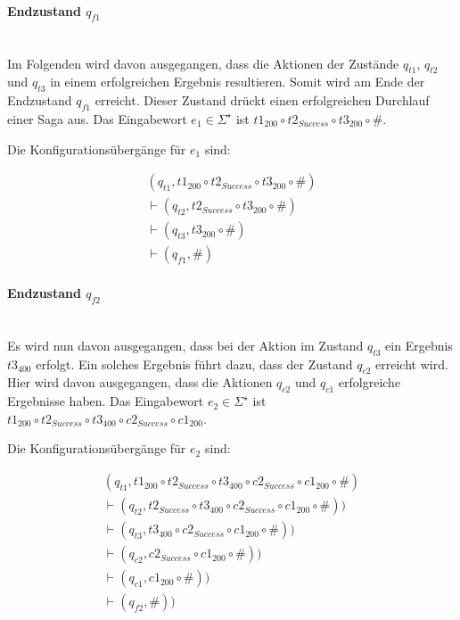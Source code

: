 \paragraph*{Endzustand $q_{f1}$} \mbox{}\\
Im Folgenden wird davon ausgegangen, dass die Aktionen der Zustände $q_{t1}$, $q_{t2}$ und $q_{t3}$ in einem erfolgreichen Ergebnis resultieren. Somit wird am Ende der Endzustand $q_{f1}$ erreicht. Dieser Zustand drückt einen erfolgreichen Durchlauf einer Saga aus. Das Eingabewort $e_1 \in \Sigma^{\star}$ ist $t1_{200} \circ t2_{Success} \circ t3_{200} \circ \#$.

Die Konfigurationsübergänge für $e_1$ sind:

\begin{align*}
	(q_{t1}, t1_{200} \circ t2_{Success} \circ t3_{200} \circ \#)\\
	\vdash(q_{t2}, t2_{Success} \circ t3_{200} \circ \#)\\
	\vdash (q_{t3}, t3_{200} \circ \#)  \\
	\vdash (q_{f1}, \#)
\end{align*}


\paragraph*{Endzustand $q_{f2}$} \mbox{}\\
Es wird nun davon ausgegangen, dass bei der Aktion im Zustand $q_{t3}$ ein Ergebnis $t3_{400}$ erfolgt. Ein solches Ergebnis führt dazu, dass der Zustand $q_{c2}$ erreicht wird. Hier wird davon ausgegangen, dass die Aktionen $q_{c2}$ und $q_{c1}$ erfolgreiche Ergebnisse haben. Das Eingabewort $e_2 \in \Sigma^{\star}$ ist $t1_{200} \circ t2_{Success} \circ t3_{400} \circ c2_{Success} \circ c1_{200}$.

Die Konfigurationsübergänge für $e_2$ sind:

\begin{align*}
	(q_{t1}, t1_{200} \circ t2_{Success} \circ t3_{400} \circ c2_{Success} \circ c1_{200} \circ \#)\\
	\vdash (q_{t2}, t2_{Success} \circ t3_{400} \circ c2_{Success} \circ c1_{200} \circ \#))\\
	\vdash (q_{t3}, t3_{400} \circ c2_{Success} \circ c1_{200} \circ \#))\\
	\vdash (q_{c2}, c2_{Success} \circ c1_{200} \circ \#))\\
	\vdash (q_{c1}, c1_{200} \circ \#))\\
	\vdash (q_{f2}, \#))
\end{align*}


